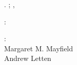 
\thispagestyle{empty}

\hfill

\vfill

\noindent\myName. \textit{\myTitle} \mySubtitle; \myDegree, \myTime

\bigskip
%
\noindent{}: \\
\myProf
%
\medskip

\noindent{}: \\
Margaret M. Mayfield \\
Andrew Letten
%
\medskip

\noindent\myLocation


